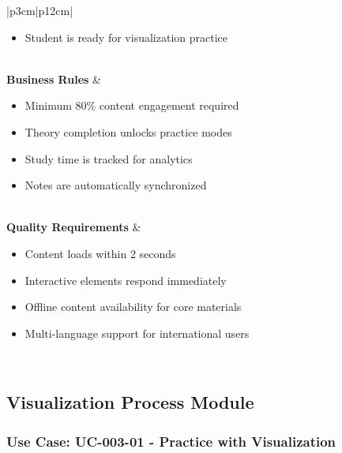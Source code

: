 \documentclass[12pt,a4paper]{article}
\begin{document}
\begin{longtable}{|p{3cm}|p{12cm}|}
\begin{minipage}[t]{\linewidth}
\begin{itemize}[leftmargin=*,noitemsep,topsep=0pt]
    \item Student is ready for visualization practice
\end{itemize}
\end{minipage} \\
\hline
\textbf{Business Rules} & 
\begin{minipage}[t]{\linewidth}
\begin{itemize}[leftmargin=*,noitemsep,topsep=0pt]
    \item Minimum 80\% content engagement required
    \item Theory completion unlocks practice modes
    \item Study time is tracked for analytics
    \item Notes are automatically synchronized
\end{itemize}
\end{minipage} \\
\hline
\textbf{Quality Requirements} & 
\begin{minipage}[t]{\linewidth}
\begin{itemize}[leftmargin=*,noitemsep,topsep=0pt]
    \item Content loads within 2 seconds
    \item Interactive elements respond immediately
    \item Offline content availability for core materials
    \item Multi-language support for international users
\end{itemize}
\end{minipage} \\
\hline
\end{longtable}

\subsection{Visualization Process Module}

\subsubsection{Use Case: UC-003-01 - Practice with Visualization}
\end{document}
